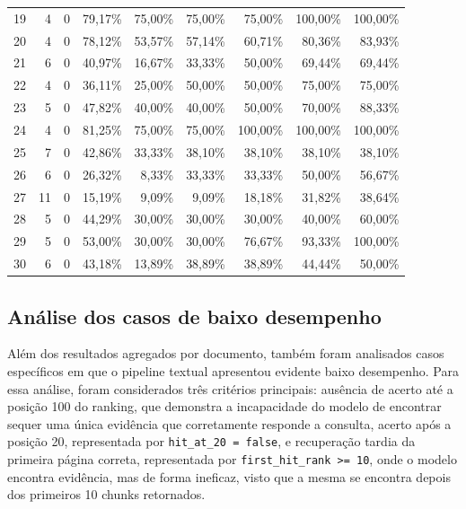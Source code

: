 \begin{table}[htbp]
{\begin{tabular}{r r r r r r r r r}
    19 & 4 & 0 & 79,17\% & 75,00\% & 75,00\% & 75,00\% & 100,00\% & 100,00\% \\
    20 & 4 & 0 & 78,12\% & 53,57\% & 57,14\% & 60,71\% & 80,36\% & 83,93\% \\
    21 & 6 & 0 & 40,97\% & 16,67\% & 33,33\% & 50,00\% & 69,44\% & 69,44\% \\
    22 & 4 & 0 & 36,11\% & 25,00\% & 50,00\% & 50,00\% & 75,00\% & 75,00\% \\
    23 & 5 & 0 & 47,82\% & 40,00\% & 40,00\% & 50,00\% & 70,00\% & 88,33\% \\
    24 & 4 & 0 & 81,25\% & 75,00\% & 75,00\% & 100,00\% & 100,00\% & 100,00\% \\
    25 & 7 & 0 & 42,86\% & 33,33\% & 38,10\% & 38,10\% & 38,10\% & 38,10\% \\
    26 & 6 & 0 & 26,32\% & 8,33\% & 33,33\% & 33,33\% & 50,00\% & 56,67\% \\
    27 & 11 & 0 & 15,19\% & 9,09\% & 9,09\% & 18,18\% & 31,82\% & 38,64\% \\
    28 & 5 & 0 & 44,29\% & 30,00\% & 30,00\% & 30,00\% & 40,00\% & 60,00\% \\
    29 & 5 & 0 & 53,00\% & 30,00\% & 30,00\% & 76,67\% & 93,33\% & 100,00\% \\
    30 & 6 & 0 & 43,18\% & 13,89\% & 38,89\% & 38,89\% & 44,44\% & 50,00\% \\
    \bottomrule
    \end{tabular}
    }
    \end{table}
    



\subsection{Análise dos casos de baixo desempenho}

Além dos resultados agregados por documento, também foram analisados casos específicos em que o pipeline textual apresentou evidente baixo desempenho. Para essa análise, foram considerados três critérios principais: ausência de acerto até a posição 100 do ranking, que demonstra a incapacidade do modelo de encontrar sequer uma única evidência que corretamente responde a consulta, acerto após a posição 20, representada por \texttt{hit\_at\_20 = false}, e recuperação tardia da primeira página correta, representada por \texttt{first\_hit\_rank >= 10}, onde o modelo encontra evidência, mas de forma ineficaz, visto que a mesma se encontra depois dos primeiros 10 chunks retornados. 

